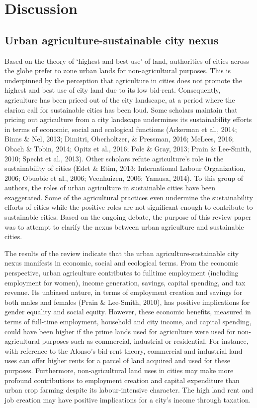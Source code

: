 \chapter{Discussion} %

\label{Chapter:Discussion}

\section{Urban agriculture-sustainable city nexus}

Based on the theory of ‘highest and best use’ of land, authorities of cities across the globe prefer to zone urban lands for non-agricultural purposes. This is underpinned by the perception that agriculture in cities does not promote the highest and best use of city land due to its low bid-rent. Consequently, agriculture has been priced out of the city landscape, at a period where the clarion call for sustainable cities has been loud. Some scholars maintain that pricing out agriculture from a city landscape undermines its sustainability efforts in terms of economic, social and ecological functions (Ackerman et al., 2014; Binns \& Nel, 2013; Dimitri, Oberholtzer, \& Pressman, 2016; McLees, 2016; Obach \& Tobin, 2014; Opitz et al., 2016; Pole \& Gray, 2013; Prain \& Lee-Smith, 2010; Specht et al., 2013). Other scholars refute agriculture's role in the sustainability of cities (Edet \& Etim, 2013; International Labour Organization, 2006; Obuobie et al., 2006; Veenhuizen, 2006; Yamusa, 2014). To this group of authors, the roles of urban agriculture in sustainable cities have been exaggerated. Some of the agricultural practices even undermine the sustainability efforts of cities while the positive roles are not significant enough to contribute to sustainable cities. Based on the ongoing debate, the purpose of this review paper was to attempt to clarify the nexus between urban agriculture and sustainable cities.

The results of the review indicate that the urban agriculture-sustainable city nexus manifests in economic, social and ecological terms. From the economic perspective, urban agriculture contributes to fulltime employment (including employment for women), income generation, savings, capital spending, and tax revenue. Its unbiased nature, in terms of employment creation and savings for both males and females (Prain \& Lee-Smith, 2010), has positive implications for gender equality and social equity. However, these economic benefits, measured in terms of full-time employment, household and city income, and capital spending, could have been higher if the prime lands used for agriculture were used for non-agricultural purposes such as commercial, industrial or residential. For instance, with reference to the Alonso's bid-rent theory, commercial and industrial land uses can offer higher rents for a parcel of land acquired and used for these purposes. Furthermore, non-agricultural land uses in cities may make more profound contributions to employment creation and capital expenditure than urban crop farming despite its labour-intensive character. The high land rent and job creation may have positive implications for a city's income through taxation.

